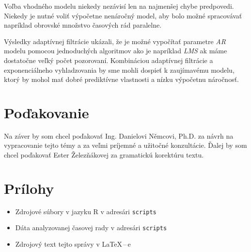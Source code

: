 \documentclass[12pt,a4paper,oneside,final]{article}
\theoremstyle{definition}
\theoremstyle{remark}
\numberwithin{equation}{section}
\begin{document}
Voľba vhodného modelu niekedy nezávisí len na najmenšej chybe predpovedi. Niekedy je nutné
voliť výpočetne nenáročný model, aby bolo možné spracovávať napríklad obrovské množstvo 
časových rád paralelne.

Výsledky adaptívnej filtrácie ukázali, že je možné vypočítať parametre \emph{AR} modelu
pomocou jednoduchých algoritmov ako je napríklad \emph{LMS} ak máme dostatočne veľký počet
pozorovaní. Kombináciou adaptívnej filtrácie a exponenciálneho vyhladzovania by sme mohli 
dospieť k zaujímavému modelu, ktorý by mohol mať dobré prediktívne vlastnosti a nízku
výpočetnu náročnosť.

\section*{Poďakovanie}
Na záver by som chcel poďakovať Ing. Danielovi Němcovi, Ph.D. za návrh na vypracovanie
tejto témy a za veľmi príjemné a užitočné konzultácie. Ďalej by som chcel poďakovať Ester
Železňákovej za gramatickú korektúru textu.




\newpage
\renewcommand{\thesection}{\Alph{section}}
\setcounter{section}{0}
\renewcommand{\thepage}{\roman{page}}
\setcounter{page}{1}

\section{Prílohy}

\begin{itemize}
    \item Zdrojové súbory v jazyku R v adresári \texttt{scripts}
    \item Dáta analyzovanej časovej rady v adresári \texttt{scripts}
    \item Zdrojový text tejto správy v \LaTeX\,--\,e
\end{itemize}
\end{document}
